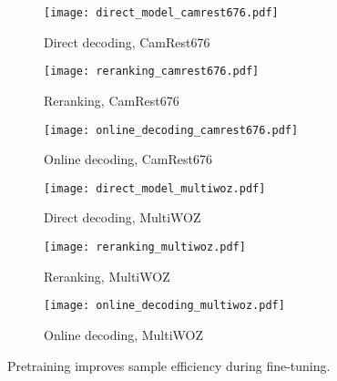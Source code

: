 \documentclass[11pt,a4paper]{article}
\begin{document}
\begin{figure*}[t]
    \centering 
    \begin{subfigure}[b]{0.33\textwidth}
        \centering 
        \texttt{[image: direct\_model\_camrest676.pdf]}
        \vspace{-1.0em}
        \caption{Direct decoding, CamRest676}    
    \end{subfigure} \hspace{-0.5em}
    \begin{subfigure}[b]{0.33\textwidth}
        \centering 
        \texttt{[image: reranking\_camrest676.pdf]}
        \vspace{-1.0em}
        \caption{Reranking, CamRest676}    
    \end{subfigure} \hspace{-0.5em}
    \begin{subfigure}[b]{0.33\textwidth}
        \centering 
        \texttt{[image: online\_decoding\_camrest676.pdf]}
        \vspace{-1.0em}
        \caption{Online decoding, CamRest676}
    \end{subfigure} \hspace{-0.5em}
    
    \begin{subfigure}[b]{0.33\textwidth}
        \centering 
        \texttt{[image: direct\_model\_multiwoz.pdf]}
        \vspace{-1.0em}
        \caption{Direct decoding, MultiWOZ}    
    \end{subfigure} \hspace{-0.5em}
    \begin{subfigure}[b]{0.33\textwidth}
        \centering 
        \texttt{[image: reranking\_multiwoz.pdf]}
        \vspace{-1.0em}
        \caption{Reranking, MultiWOZ}    
    \end{subfigure} \hspace{-0.5em}
    \begin{subfigure}[b]{0.33\textwidth}
        \centering 
        \texttt{[image: online\_decoding\_multiwoz.pdf]}
        \vspace{-1.0em}
        \caption{Online decoding, MultiWOZ}    
    \end{subfigure}
    \vspace{-0.5em}
    \caption{Pretraining improves sample efficiency during fine-tuning.\label{fig:sample_efficiency}} 
    \vspace{-0.5em}
\end{figure*}
\end{document}
